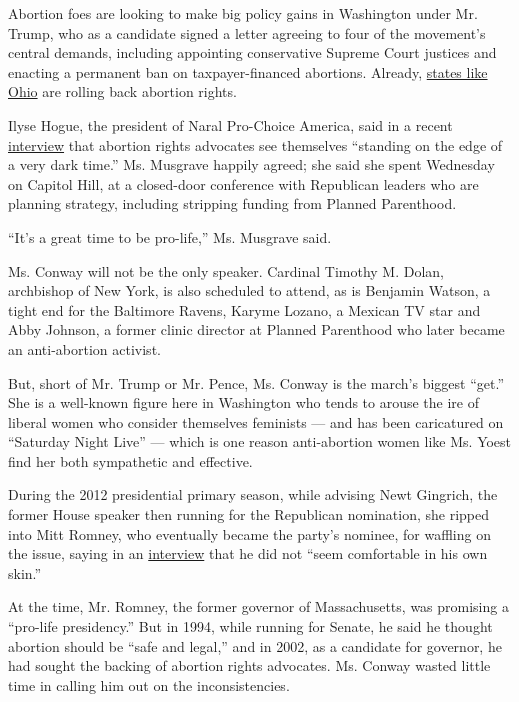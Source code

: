 Abortion foes are looking to make big policy gains in Washington under
Mr. Trump, who as a candidate signed a letter agreeing to four of the
movement's central demands, including appointing conservative Supreme
Court justices and enacting a permanent ban on taxpayer-financed
abortions. Already,
\href{https://www.nytimes.com/2016/12/11/us/abortion-foes-donald-trump-restrictions-politics.html}{states
like Ohio} are rolling back abortion rights.

Ilyse Hogue, the president of Naral Pro-Choice America, said in a recent
\href{https://www.nytimes.com/2016/12/11/us/abortion-foes-donald-trump-restrictions-politics.html}{interview}
that abortion rights advocates see themselves ``standing on the edge of
a very dark time.'' Ms. Musgrave happily agreed; she said she spent
Wednesday on Capitol Hill, at a closed-door conference with Republican
leaders who are planning strategy, including stripping funding from
Planned Parenthood.

``It's a great time to be pro-life,'' Ms. Musgrave said.

Ms. Conway will not be the only speaker. Cardinal Timothy M. Dolan,
archbishop of New York, is also scheduled to attend, as is Benjamin
Watson, a tight end for the Baltimore Ravens, Karyme Lozano, a Mexican
TV star and Abby Johnson, a former clinic director at Planned Parenthood
who later became an anti-abortion activist.

But, short of Mr. Trump or Mr. Pence, Ms. Conway is the march's biggest
``get.'' She is a well-known figure here in Washington who tends to
arouse the ire of liberal women who consider themselves feminists ---
and has been caricatured on ``Saturday Night Live'' --- which is one
reason anti-abortion women like Ms. Yoest find her both sympathetic and
effective.

During the 2012 presidential primary season, while advising Newt
Gingrich, the former House speaker then running for the Republican
nomination, she ripped into Mitt Romney, who eventually became the
party's nominee, for waffling on the issue, saying in an
\href{http://www.nytimes.com/2012/02/12/us/politics/romneys-path-to-pro-life-position-on-abortion.html}{interview}
that he did not ``seem comfortable in his own skin.''

At the time, Mr. Romney, the former governor of Massachusetts, was
promising a ``pro-life presidency.'' But in 1994, while running for
Senate, he said he thought abortion should be ``safe and legal,'' and in
2002, as a candidate for governor, he had sought the backing of abortion
rights advocates. Ms. Conway wasted little time in calling him out on
the inconsistencies.

